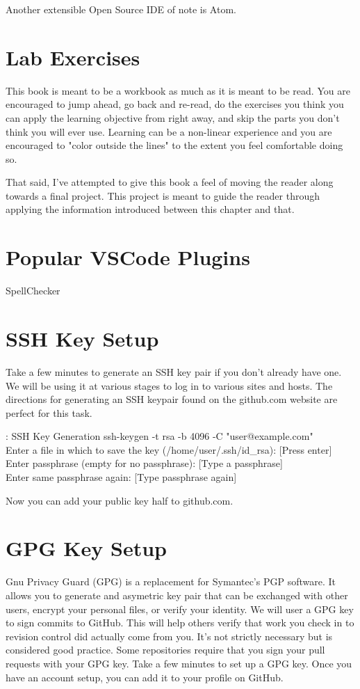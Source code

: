 \justify
Another extensible Open Source IDE of note is Atom. 

\section{Lab Exercises}
\justify
This book is meant to be a workbook as much as it is meant to be read. 
You are encouraged to jump ahead, go back and re-read, do the exercises
you think you can apply the learning objective from right away, 
and skip the parts you don't think you will ever use. Learning can 
be a non-linear experience and you 
are encouraged to "color outside the lines" to the extent you feel 
comfortable doing so.

\justify
That said, I've attempted to give this book a feel of moving the reader
along towards a final project. 
This project is meant to guide the reader through applying the information 
introduced between this chapter and that.

\section{Popular VSCode Plugins}
\justify
SpellChecker

\section{SSH Key Setup}
\justify
Take a few minutes to generate an SSH key pair if you don't already have
one. We will be using it at various stages to log in to various sites
and hosts. The directions for generating an SSH keypair found on the
github.com website
are perfect for this task.

\begin{mybox}{\thetcbcounter: SSH Key Generation}
	ssh-keygen -t rsa -b 4096 -C "user@example.com"\\
	Enter a file in which to save the key (/home/user/.ssh/id\_rsa): [Press enter]\\
	Enter passphrase (empty for no passphrase): [Type a passphrase]\\
	Enter same passphrase again: [Type passphrase again]
\end{mybox}

\justify
Now you can add your public key half to github.com.

\section{GPG Key Setup}
\justify
Gnu Privacy Guard (GPG) is a replacement for Symantec's PGP software. It allows you
to generate and asymetric key pair that can be exchanged with other users, encrypt your
personal files, or verify your identity. 
\justify
We will user a GPG key to sign commits
to GitHub. This will help others verify that work you check in to revision control did 
actually come from you. It's not strictly necessary but is considered good practice.
Some repositories require that you sign your pull requests with your GPG key.
\justify
Take a few minutes to set up a GPG key. Once you have an account setup, you can add
it to your profile on GitHub.

